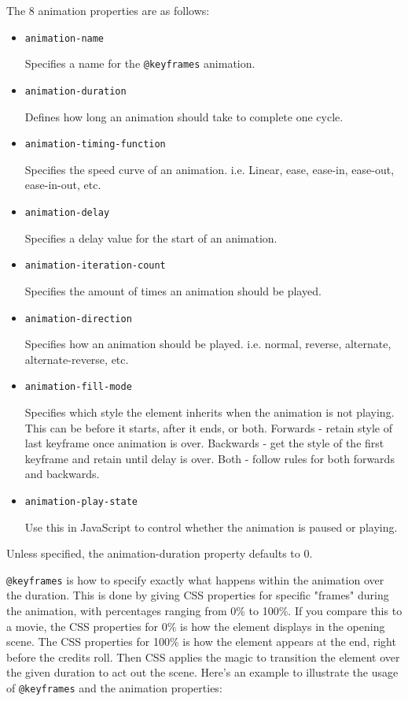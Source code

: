 The 8 animation properties are as follows:

\begin{itemize}
    \item \texttt{animation-name}

        Specifies a name for the \texttt{@keyframes} animation.
    \item \texttt{animation-duration}

        Defines how long an animation should take to complete one cycle.
    \item \texttt{animation-timing-function}

        Specifies the speed curve of an animation. i.e. Linear, ease, ease-in, ease-out, ease-in-out, etc.
    \item \texttt{animation-delay}

        Specifies a delay value for the start of an animation.
    \item \texttt{animation-iteration-count}

        Specifies the amount of times an animation should be played.
    \item \texttt{animation-direction}

        Specifies how an animation should be played. i.e. normal, reverse, alternate, alternate-reverse, etc.
    \item \texttt{animation-fill-mode}

        Specifies which style the element inherits when the animation is not playing. This can be before it starts, after it ends, or both. Forwards - retain style of last keyframe once animation is over. Backwards - get the style of the first keyframe and retain until delay is over. Both - follow rules for both forwards and backwards.
    \item \texttt{animation-play-state}

        Use this in JavaScript to control whether the animation is paused or playing.
\end{itemize}

Unless specified, the animation-duration property defaults to 0.

\texttt{@keyframes} is how to specify exactly what happens within the animation over the duration. This is done by giving CSS properties for specific "frames" during the animation, with percentages ranging from 0\% to 100\%. If you compare this to a movie, the CSS properties for 0\% is how the element displays in the opening scene. The CSS properties for 100\% is how the element appears at the end, right before the credits roll. Then CSS applies the magic to transition the element over the given duration to act out the scene. Here's an example to illustrate the usage of \texttt{@keyframes} and the animation properties:

